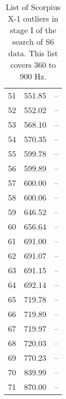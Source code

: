 \begin{table}
\begin{center}
\begin{tabular}{r r l}
51 & 551.85 & -- \\
52 & 552.02 & -- \\
53 & 568.10 & -- \\
54 & 570.35 & -- \\
55 & 599.78 & -- \\
56 & 599.89 & -- \\
57 & 600.00 & -- \\
58 & 600.06 & -- \\
59 & 646.52 & -- \\
60 & 656.64 & -- \\
61 & 691.00 & -- \\
62 & 691.07 & -- \\
63 & 691.15 & -- \\
64 & 692.14 & -- \\
65 & 719.78 & -- \\
66 & 719.89 & -- \\
67 & 719.97 & -- \\
68 & 720.03 & -- \\
69 & 770.23 & -- \\
70 & 839.99 & -- \\
71 & 870.00 & -- \\
\end{tabular}
\caption{List of Scorpius X-1 outliers in stage I of the search of S6 data. This list covers 360 to 900 Hz.}
\label{ScoX1S6outlierTableHF1}
\end{center}
\end{table}

